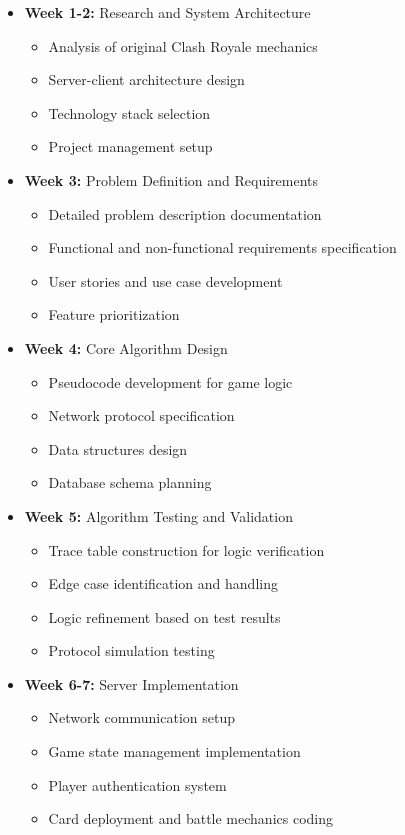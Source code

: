 \documentclass{article}
\begin{document}
\begin{itemize}[leftmargin=*]
    \item \textbf{Week 1-2:} Research and System Architecture
    \begin{itemize}
        \item Analysis of original Clash Royale mechanics
        \item Server-client architecture design
        \item Technology stack selection
        \item Project management setup
    \end{itemize}
    
    \item \textbf{Week 3:} Problem Definition and Requirements
    \begin{itemize}
        \item Detailed problem description documentation
        \item Functional and non-functional requirements specification
        \item User stories and use case development
        \item Feature prioritization
    \end{itemize}
    
    \item \textbf{Week 4:} Core Algorithm Design
    \begin{itemize}
        \item Pseudocode development for game logic
        \item Network protocol specification
        \item Data structures design
        \item Database schema planning
    \end{itemize}
    
    \item \textbf{Week 5:} Algorithm Testing and Validation
    \begin{itemize}
        \item Trace table construction for logic verification
        \item Edge case identification and handling
        \item Logic refinement based on test results
        \item Protocol simulation testing
    \end{itemize}
    
    \item \textbf{Week 6-7:} Server Implementation
    \begin{itemize}
        \item Network communication setup
        \item Game state management implementation
        \item Player authentication system
        \item Card deployment and battle mechanics coding
    \end{itemize}
    

\end{itemize}
\end{document}
